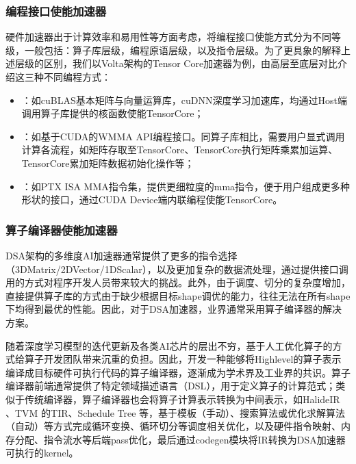 \documentclass[letterpaper,10pt,english]{sphinxmanual}
\begin{document}
\subsubsection{编程接口使能加速器}
\label{\detokenize{chapter_accelerator/accelerator_programming:id3}}
\sphinxAtStartPar
硬件加速器出于计算效率和易用性等方面考虑，将编程接口使能方式分为不同等级，一般包括：算子库层级，编程原语层级，以及指令层级。为了更具象的解释上述层级的区别，我们以Volta架构的Tensor
Core加速器为例，由高层至底层对比介绍这三种不同编程方式：
\begin{itemize}
\item {} 
\sphinxAtStartPar
{}：如cuBLAS基本矩阵与向量运算库，cuDNN深度学习加速库，均通过Host端调用算子库提供的核函数使能TensorCore；

\item {} 
\sphinxAtStartPar
{}：如基于CUDA的WMMA
API编程接口。同算子库相比，需要用户显式调用计算各流程，如矩阵存取至TensorCore、TensorCore执行矩阵乘累加运算、TensorCore累加矩阵数据初始化操作等；

\item {} 
\sphinxAtStartPar
{}：如PTX ISA
MMA指令集，提供更细粒度的mma指令，便于用户组成更多种形状的接口，通过CUDA
Device端内联编程使能TensorCore。

\end{itemize}


\subsubsection{算子编译器使能加速器}
\label{\detokenize{chapter_accelerator/accelerator_programming:id4}}
\sphinxAtStartPar
DSA架构的多维度AI加速器通常提供了更多的指令选择（3D\sphinxhyphen{}Matrix/2D\sphinxhyphen{}Vector/1D\sphinxhyphen{}Scalar），以及更加复杂的数据流处理，通过提供接口调用的方式对程序开发人员带来较大的挑战。此外，由于调度、切分的复杂度增加，直接提供算子库的方式由于缺少根据目标shape调优的能力，往往无法在所有shape下均得到最优的性能。因此，对于DSA加速器，业界通常采用算子编译器的解决方案。

\sphinxAtStartPar
随着深度学习模型的迭代更新及各类AI芯片的层出不穷，基于人工优化算子的方式给算子开发团队带来沉重的负担。因此，开发一种能够将High\sphinxhyphen{}level的算子表示编译成目标硬件可执行代码的算子编译器，逐渐成为学术界及工业界的共识。算子编译器前端通常提供了特定领域描述语言（DSL），用于定义算子的计算范式；类似于传统编译器，算子编译器也会将算子计算表示转换为中间表示，如HalideIR
、TVM 的TIR、Schedule
Tree
等，基于模板（手动）、搜索算法或优化求解算法（自动）等方式完成循环变换、循环切分等调度相关优化，以及硬件指令映射、内存分配、指令流水等后端pass优化，最后通过codegen模块将IR转换为DSA加速器可执行的kernel。
\end{document}
